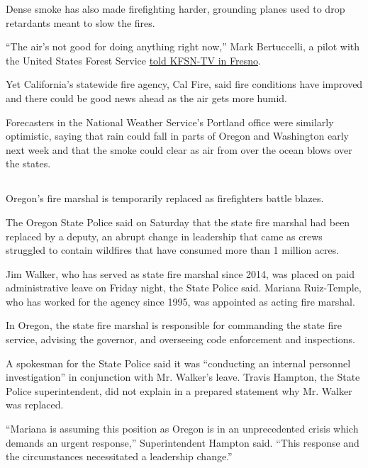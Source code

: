 Dense smoke has also made firefighting harder, grounding planes used to
drop retardants meant to slow the fires.

``The air's not good for doing anything right now,'' Mark Bertuccelli, a
pilot with the United States Forest Service
\href{https://abc30.com/creek-fire-air-drops-firefight-pilot-smoke-firefighter-from-above/6417975/}{told
KFSN-TV in Fresno}.

Yet California's statewide fire agency, Cal Fire, said fire conditions
have improved and there could be good news ahead as the air gets more
humid.

Forecasters in the National Weather Service's Portland office were
similarly optimistic, saying that rain could fall in parts of Oregon and
Washington early next week and that the smoke could clear as air from
over the ocean blows over the states.

\hypertarget{-2}{%
\subsection{}\label{-2}}

Oregon's fire marshal is temporarily replaced as firefighters battle
blazes.

The Oregon State Police said on Saturday that the state fire marshal had
been replaced by a deputy, an abrupt change in leadership that came as
crews struggled to contain wildfires that have consumed more than 1
million acres.

Jim Walker, who has served as state fire marshal since 2014, was placed
on paid administrative leave on Friday night, the State Police said.
Mariana Ruiz-Temple, who has worked for the agency since 1995, was
appointed as acting fire marshal.

In Oregon, the state fire marshal is responsible for commanding the
state fire service, advising the governor, and overseeing code
enforcement and inspections.

A spokesman for the State Police said it was ``conducting an internal
personnel investigation'' in conjunction with Mr. Walker's leave. Travis
Hampton, the State Police superintendent, did not explain in a prepared
statement why Mr. Walker was replaced.

``Mariana is assuming this position as Oregon is in an unprecedented
crisis which demands an urgent response,'' Superintendent Hampton said.
``This response and the circumstances necessitated a leadership
change.''

\hypertarget{-3}{%
\subsection{}\label{-3}}

